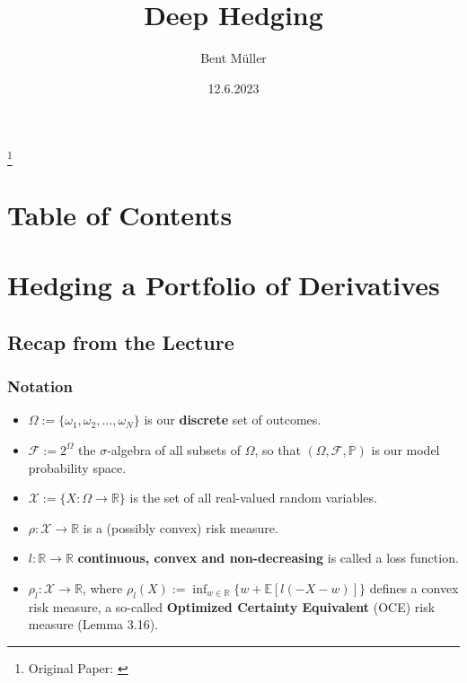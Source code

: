 \documentclass[serif]{beamer}
\title{Deep Hedging}
\author{Bent Müller}
\institute{University of Hamburg, Department of Mathematics}
\date{12.6.2023}
\def\R{{\mathbb R}}
\def\P{{\mathbb P}}
\def\E{{\mathbb E}}
\def\O{{\Omega}}
\def\cF{{\mathcal F}}
\def\cX{{\mathcal X}}
\def\ps{{(\O, \cF, \P)}}
\begin{document}
\begin{frame}
    \titlepage
    \footnote{
        Original Paper: \cite[Deep Hedging]{bühler2018deep}
    }
\end{frame}


\section{Table of Contents}
\begin{frame}
    \tableofcontents
\end{frame}

\section{Hedging a Portfolio of Derivatives}

\subsection{Recap from the Lecture}
\begin{frame}
    \frametitle{Notation}
    \begin{itemize}
        \item $\O := \{ \omega_1, \omega_2, \dots, \omega_N \}$ is our \textbf{discrete} set of outcomes.
        \item $\cF := 2^\O$ the $\sigma$-algebra of all subsets of $\O$, so that $\ps$ is our model probability space.
        \item $\cX := \{X: \O \to \R\}$ is the set of all real-valued random variables.
        \item $\rho: \cX \to \R$ is a (possibly convex) risk measure.
        \item $l: \R \to \R$ \textbf{continuous, convex and non-decreasing} is called a loss function.
        \item $\rho_l: \cX \to \R$, where $\rho_l (X) := \inf_{w \in \R} \{ w + \E [ l (-X -w) ] \}$ defines
              a convex risk measure, a so-called \textbf{Optimized Certainty Equivalent} (OCE) risk measure
              (Lemma 3.16).
    \end{itemize}
\end{frame}
\end{document}
